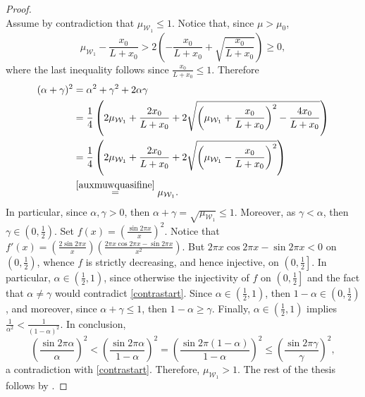 \documentclass[11pt]{amsart}
\renewcommand{\leq}{\leqslant}
\renewcommand{\geq}{\geqslant}
\theoremstyle{definition}
\theoremstyle{remark}
\numberwithin{equation}{section}
\begin{document}
\begin{proof}
\begin{equation}
\end{equation}
Assume by contradiction that $\mu_{\mathcal W_1}\leq 1$. Notice that, since $\mu>\mu_0$,
\begin{equation}\label{auxmuwquasifine}
\mu_{\mathcal W_1}-\frac{x_0}{L+x_0}>2\left(-\frac{x_0}{L+x_0}+\sqrt{\frac{x_0}{L+x_0}}\right)\geq 0,
\end{equation}
where the last inequality follows since $\frac{x_0}{L+x_0}\leq 1$. Therefore
\begin{equation*}
\begin{split}
(\alpha+\gamma)^2&=\alpha^2+\gamma^2+2\alpha\gamma\\
&=\frac{1}{4}\left(2\mu_{\mathcal W_1}+\frac{2x_0}{L+x_0}+2\sqrt{\left(\mu_{\mathcal W_1}+\frac{x_0}{L+x_0}\right)^2-\frac{4x_0}{L+x_0}}\right)\\
&=\frac{1}{4}\left(2\mu_{\mathcal W_1}+\frac{2x_0}{L+x_0}+2\sqrt{\left(\mu_{\mathcal W_1}-\frac{x_0}{L+x_0}\right)^2}\right)\\
&\overset{\eqref{auxmuwquasifine}}{=}\mu_{\mathcal W_1}.
\end{split}
\end{equation*}
In particular, since $\alpha,\gamma>0$, then $  \alpha+\gamma=\sqrt{\mu_{\mathcal W_1}}\leq 1$. Moreover, as $\gamma<\alpha$, then $\gamma\in\left(0,\frac{1}{2}\right).$ Set $f(x)=\left(\frac{\sin2\pi x}{x}\right)^2$. Notice that $f'(x)=\left(\frac{2\sin2\pi x}{x}\right)\left(\frac{2\pi x\cos 2\pi x-\sin 2\pi x}{x^2}\right)$. But $2\pi x\cos 2\pi x-\sin 2\pi x<0$ on $\left(0,\frac{1}{2}\right)$, whence $f$ is strictly decreasing, and hence injective, on $\left(0,\frac{1}{2}\right]$. In particular, $\alpha\in \left(\frac{1}{2},1\right)$, since otherwise the injectivity of $f$ on $\left(0,\frac{1}{2}\right]$ and the fact that $\alpha\neq \gamma$ would contradict \eqref{contrastart}. Since $\alpha\in \left(\frac{1}{2},1\right)$, then $1-\alpha\in \left(0,\frac{1}{2}\right)$, and moreover, since $\alpha+\gamma\leq 1$, then $1-\alpha\geq\gamma$. Finally, $\alpha\in \left(\frac{1}{2},1\right)$ implies $\frac{1}{\alpha^2}<\frac{1}{(1-\alpha)^2}$. In conclusion, 
\begin{equation*}
\left(\frac{\sin 2\pi\alpha}{\alpha}\right)^2 <\left(\frac{\sin 2\pi\alpha}{1-\alpha}\right)^2=\left(\frac{\sin 2\pi(1-\alpha)}{1-\alpha}\right)^2\leq  \left(\frac{\sin 2\pi\gamma}{\gamma}\right)^2,
\end{equation*}
a contradiction with \eqref{contrastart}. Therefore, $\mu_{\mathcal W_1}>1$. The rest of the thesis follows by .
\end{proof}
\end{document}
